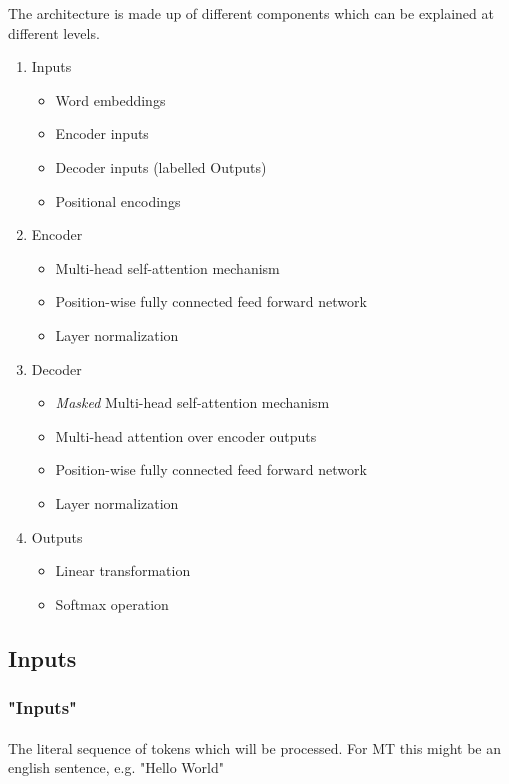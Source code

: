 \documentclass{article}
\begin{document}
    The architecture is made up of different components which can be explained at different levels.
    \pagebreak
    \begin{enumerate}
        \item Inputs
        \begin{itemize}
            \item Word embeddings
            \item Encoder inputs
            \item Decoder inputs (labelled Outputs)
            \item Positional encodings
        \end{itemize}
        \item Encoder
        \begin{itemize}
            \item Multi-head self-attention mechanism
            \item Position-wise fully connected feed forward network
            \item Layer normalization
        \end{itemize}
        \item Decoder
        \begin{itemize}
            \item \emph{Masked} Multi-head self-attention mechanism
            \item Multi-head attention over encoder outputs
            \item Position-wise fully connected feed forward network
            \item Layer normalization
        \end{itemize}
        \item Outputs
        \begin{itemize}
            \item Linear transformation
            \item Softmax operation
        \end{itemize}
    \end{enumerate}
    \subsection{Inputs}

    \subsubsection{"Inputs"}
    \paragraph{} The literal sequence of tokens which will be processed. For MT this might be an english sentence, e.g. "Hello World"
\end{document}

